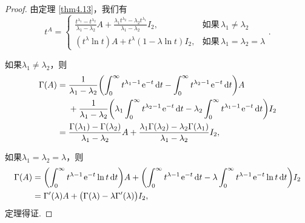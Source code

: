 \begin{proof}
  由定理 \ref{thm4.13}，我们有
  \[
    t^A = \begin{cases}
      \frac{t^{\lambda_1}-t^{\lambda_2}}{\lambda_1-\lambda_2}
      A + \frac{\lambda_1t^{\lambda_2}-\lambda_2t^{\lambda_1}}{\lambda_1-\lambda_2}I_2,
      & \text{如果}\, \lambda_1\ne \lambda_2 \\
      (t^\lambda\ln t)A + t^\lambda(1-\lambda\ln t)I_2, & \text{如果}\, \lambda_1=\lambda_2=\lambda
    \end{cases}.
  \]

  如果$\lambda_1\ne\lambda_2$，则
  \begin{align*}
    \Gamma(A) = {}& \frac1{\lambda_1-\lambda_2} \left( \int_0^\infty t^{\lambda_1-1}\ee^{-t}\dif t - \int_0^\infty t^{\lambda_2-1}\ee^{-t}\dif t \right)A \\
    & + \frac1{\lambda_1-\lambda_2} \left( \lambda_1\int_0^\infty t^{\lambda_2-1}\ee^{-t}\dif t - \lambda_2\int_0^\infty t^{\lambda_1-1}\ee^{-t}\dif t \right)I_2 \\
    = {}& \frac{\Gamma(\lambda_1)-\Gamma(\lambda_2)}{
        \lambda_1-\lambda_2}A + \frac{
        \lambda_1\Gamma(\lambda_2)-\lambda_2
        \Gamma(\lambda_1)}{\lambda_1-\lambda_2}I_2,
  \end{align*}

  如果$\lambda_1=\lambda_2=\lambda$，则
  \begin{align*}
    \Gamma(A) & = \left( \int_0^\infty t^{\lambda-1}\ee^{-t}\ln t\dif t \right) A
    + \left( \int_0^\infty t^{\lambda-1}\ee^{-t}\dif t - \lambda\int_0^\infty t^{\lambda-1}\ee^{-t}\ln t\dif t \right)I_2 \\
    & = \Gamma'(\lambda)A + \big( \Gamma(\lambda) - \lambda\Gamma'(\lambda) \big)I_2,
  \end{align*}
  定理得证.
\end{proof}


